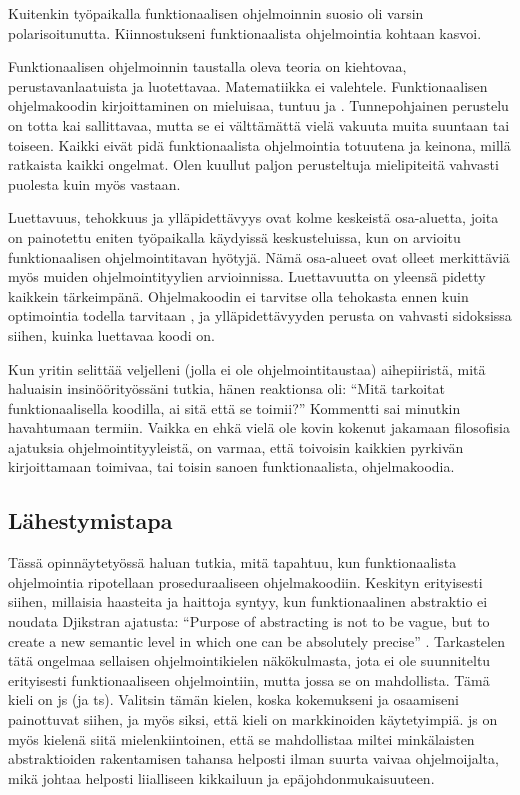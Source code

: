 Kuitenkin työpaikalla funktionaalisen ohjelmoinnin suosio oli varsin polarisoitunutta. Kiinnostukseni funktionaalista ohjelmointia kohtaan kasvoi.

Funktionaalisen ohjelmoinnin taustalla oleva teoria on kiehtovaa, perustavanlaatuista ja luotettavaa. Matematiikka ei valehtele. Funktionaalisen ohjelmakoodin kirjoittaminen on mieluisaa, tuntuu  ja . Tunnepohjainen perustelu on totta kai sallittavaa, mutta se ei välttämättä vielä vakuuta muita suuntaan tai toiseen. Kaikki eivät pidä funktionaalista ohjelmointia totuutena ja keinona, millä ratkaista kaikki ongelmat. Olen kuullut paljon perusteltuja mielipiteitä vahvasti  puolesta kuin myös vastaan.

Luettavuus, tehokkuus ja ylläpidettävyys ovat kolme keskeistä osa-aluetta, joita on painotettu eniten työpaikalla käydyissä keskusteluissa, kun on arvioitu funktionaalisen ohjelmointitavan hyötyjä. Nämä osa-alueet ovat olleet merkittäviä myös muiden ohjelmointityylien arvioinnissa. Luettavuutta on yleensä pidetty kaikkein tärkeimpänä. Ohjelmakoodin ei tarvitse olla tehokasta ennen kuin optimointia todella tarvitaan \cite{prematureoptimization}, ja ylläpidettävyyden perusta on vahvasti sidoksissa siihen, kuinka luettavaa koodi on.

Kun yritin selittää veljelleni (jolla ei ole ohjelmointitaustaa) aihepiiristä, mitä haluaisin insinöörityössäni tutkia, hänen reaktionsa oli: \enquote{Mitä tarkoitat funktionaalisella koodilla, ai sitä että se toimii?} Kommentti sai minutkin havahtumaan termiin. Vaikka en ehkä vielä ole kovin kokenut jakamaan filosofisia ajatuksia ohjelmointityyleistä, on varmaa, että toivoisin kaikkien pyrkivän kirjoittamaan toimivaa, tai toisin sanoen funktionaalista, ohjelmakoodia.

\subsection{Lähestymistapa}

Tässä opinnäytetyössä haluan tutkia, mitä tapahtuu, kun funktionaalista ohjelmointia ripotellaan proseduraaliseen ohjelmakoodiin. Keskityn erityisesti siihen, millaisia haasteita ja haittoja syntyy, kun funktionaalinen abstraktio ei noudata Djikstran ajatusta: \enquote{Purpose of abstracting is not to be vague, but to create a new semantic level in which one can be absolutely precise} \cite{dijkstra_humble_programmer}. Tarkastelen tätä ongelmaa sellaisen ohjelmointikielen näkökulmasta, jota ei ole suunniteltu erityisesti funktionaaliseen ohjelmointiin, mutta jossa se on mahdollista. Tämä kieli on \gls{js} (ja \gls{ts}). Valitsin tämän kielen, koska kokemukseni ja osaamiseni painottuvat siihen, ja myös siksi, että kieli on markkinoiden käytetyimpiä. \Gls{js} on myös kielenä siitä mielenkiintoinen, että se mahdollistaa miltei minkälaisten abstraktioiden rakentamisen tahansa helposti ilman suurta vaivaa ohjelmoijalta, mikä johtaa helposti liialliseen kikkailuun ja epäjohdonmukaisuuteen.

